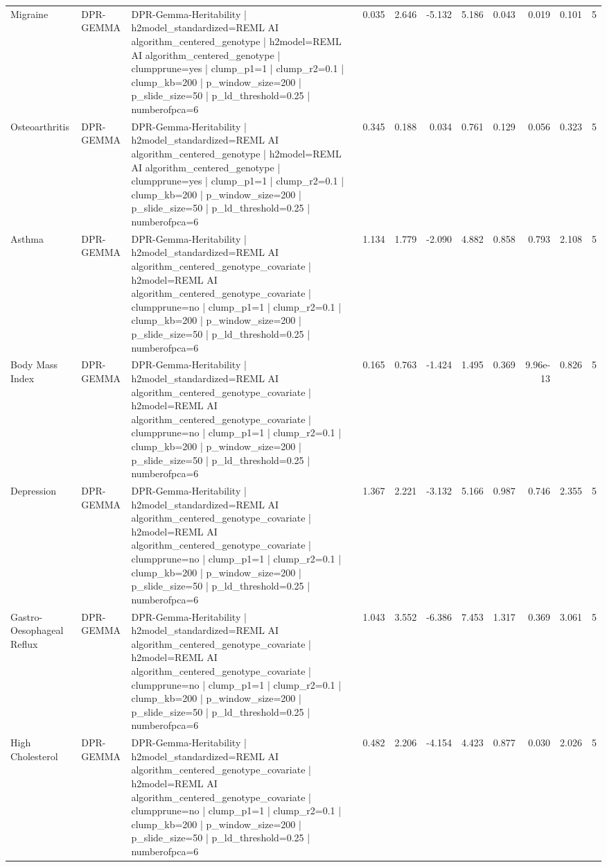 \begin{landscape}
\begin{longtable}{p{2.4cm}p{1.8cm}p{6.0cm}rrrrrrrr}
Migraine & DPR-GEMMA & DPR-Gemma-Heritability | h2model\_standardized=REML AI algorithm\_centered\_genotype | h2model=REML AI algorithm\_centered\_genotype | clumpprune=yes | clump\_p1=1 | clump\_r2=0.1 | clump\_kb=200 | p\_window\_size=200 | p\_slide\_size=50 | p\_ld\_threshold=0.25 | numberofpca=6 & 0.035 & 2.646 & -5.132 & 5.186 & 0.043 & 0.019 & 0.101 & 5 \\
Osteoarthritis & DPR-GEMMA & DPR-Gemma-Heritability | h2model\_standardized=REML AI algorithm\_centered\_genotype | h2model=REML AI algorithm\_centered\_genotype | clumpprune=yes | clump\_p1=1 | clump\_r2=0.1 | clump\_kb=200 | p\_window\_size=200 | p\_slide\_size=50 | p\_ld\_threshold=0.25 | numberofpca=6 & 0.345 & 0.188 & 0.034 & 0.761 & 0.129 & 0.056 & 0.323 & 5 \\
Asthma & DPR-GEMMA & DPR-Gemma-Heritability | h2model\_standardized=REML AI algorithm\_centered\_genotype\_covariate | h2model=REML AI algorithm\_centered\_genotype\_covariate | clumpprune=no | clump\_p1=1 | clump\_r2=0.1 | clump\_kb=200 | p\_window\_size=200 | p\_slide\_size=50 | p\_ld\_threshold=0.25 | numberofpca=6 & 1.134 & 1.779 & -2.090 & 4.882 & 0.858 & 0.793 & 2.108 & 5 \\
Body Mass Index & DPR-GEMMA & DPR-Gemma-Heritability | h2model\_standardized=REML AI algorithm\_centered\_genotype\_covariate | h2model=REML AI algorithm\_centered\_genotype\_covariate | clumpprune=no | clump\_p1=1 | clump\_r2=0.1 | clump\_kb=200 | p\_window\_size=200 | p\_slide\_size=50 | p\_ld\_threshold=0.25 | numberofpca=6 & 0.165 & 0.763 & -1.424 & 1.495 & 0.369 & 9.96e-13 & 0.826 & 5 \\
Depression & DPR-GEMMA & DPR-Gemma-Heritability | h2model\_standardized=REML AI algorithm\_centered\_genotype\_covariate | h2model=REML AI algorithm\_centered\_genotype\_covariate | clumpprune=no | clump\_p1=1 | clump\_r2=0.1 | clump\_kb=200 | p\_window\_size=200 | p\_slide\_size=50 | p\_ld\_threshold=0.25 | numberofpca=6 & 1.367 & 2.221 & -3.132 & 5.166 & 0.987 & 0.746 & 2.355 & 5 \\
Gastro-Oesophageal Reflux & DPR-GEMMA & DPR-Gemma-Heritability | h2model\_standardized=REML AI algorithm\_centered\_genotype\_covariate | h2model=REML AI algorithm\_centered\_genotype\_covariate | clumpprune=no | clump\_p1=1 | clump\_r2=0.1 | clump\_kb=200 | p\_window\_size=200 | p\_slide\_size=50 | p\_ld\_threshold=0.25 | numberofpca=6 & 1.043 & 3.552 & -6.386 & 7.453 & 1.317 & 0.369 & 3.061 & 5 \\
High Cholesterol & DPR-GEMMA & DPR-Gemma-Heritability | h2model\_standardized=REML AI algorithm\_centered\_genotype\_covariate | h2model=REML AI algorithm\_centered\_genotype\_covariate | clumpprune=no | clump\_p1=1 | clump\_r2=0.1 | clump\_kb=200 | p\_window\_size=200 | p\_slide\_size=50 | p\_ld\_threshold=0.25 | numberofpca=6 & 0.482 & 2.206 & -4.154 & 4.423 & 0.877 & 0.030 & 2.026 & 5 \\

\end{longtable}
\end{landscape}
